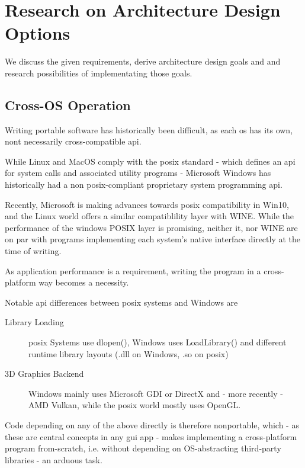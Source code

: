 \chapter{Research on Architecture Design Options}

We discuss the given requirements, derive architecture design goals and and research possibilities of implementating those goals.

\section{Cross-OS Operation}

Writing portable software has historically been difficult, as each \gls{os} has its own, nont necessarily cross-compatible \gls{api}.

While Linux and MacOS comply with the \gls{posix} standard - which defines an \gls{api} for system calls and associated utility programs - Microsoft Windows has historically had a non \gls{posix}-compliant proprietary system programming \gls{api}.

Recently, Microsoft is making advances towards \gls{posix} compatibility in Win10, and the Linux world offers a similar compatiblility layer with WINE. While the performance of the windows POSIX layer is promising, neither it, nor WINE are on par with programs implementing each system's native interface directly at the time of writing.

As application performance is a requirement, writing the program in a cross-platform way becomes a necessity.

Notable \gls{api} differences between \gls{posix} systems and Windows are
\begin{description}
	\item[Library Loading] \gls{posix} Systems use dlopen(), Windows uses LoadLibrary() and different runtime library layouts (.dll on Windows, .so on \gls{posix})
	\item[3D Graphics Backend] Windows mainly uses Microsoft GDI or DirectX and - more recently - AMD Vulkan, while the \gls{posix} world mostly uses OpenGL.
\end{description}

Code depending on any of the above directly is therefore nonportable, which - as these are central concepts in any \gls{gui} app - makes implementing a cross-platform program from-scratch, i.e. without depending on OS-abstracting third-party libraries - an arduous task.

